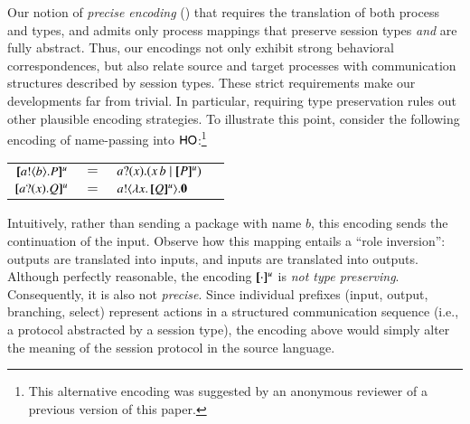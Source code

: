 Our notion of \emph{precise encoding} () that
requires the translation of both process and types, and 
admits only process mappings that preserve session types
\emph{and} are fully abstract. Thus, our encodings 
not only exhibit  strong behavioral correspondences, but also 
 relate source and target processes with  
communication structures described by session types.
These strict requirements make our developments far from trivial.
In particular, requiring type preservation rules out other plausible encoding strategies.
To illustrate this point,
consider the  following encoding of %
name-passing 
into $\mathsf{HO}$:\footnote{This alternative  encoding was suggested by an anonymous reviewer of a previous version of this paper.} %
\begin{center}
\begin{tabular}{rcll}
  $[\!\![a ! \langle b \rangle . P]\!\!]^u$	&$=$&	$a ? (x) .( x\, {b} \;|\; [\!\![P]\!\!]^u)$ \\
  $[\!\![a ? (x) . Q]\!\!]^u$	&$=$&	$a ! \langle \lambda x.\,[\!\![Q]\!\!]^u \rangle . \mathbf{0}$
\end{tabular}
\end{center}
Intuitively, 
rather than sending a package with name $b$, 
this encoding sends the continuation of the input. Observe how this mapping entails  a 
``role inversion'': outputs are translated into inputs, and inputs are translated into outputs. 
Although perfectly reasonable, the encoding $[\!\![\cdot]\!\!]^u$  
is \emph{not type preserving}. Consequently, it is also not \emph{precise}.
Since individual prefixes (input, output, branching, select) 
represent actions in a structured communication sequence (i.e., a protocol abstracted by a session type),
the encoding above would simply alter the meaning of the session protocol in the source language.




